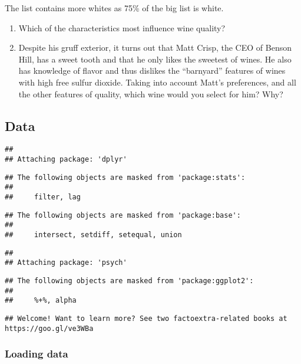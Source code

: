 \documentclass[
]{article}
\begin{document}
The list contains more whites as 75\% of the big list is white.

\begin{enumerate}
\def\labelenumi{\arabic{enumi}.}
\setcounter{enumi}{2}
\item
  Which of the characteristics most influence wine quality?
\item
  Despite his gruff exterior, it turns out that Matt Crisp, the CEO of
  Benson Hill, has a sweet tooth and that he only likes the sweetest of
  wines. He also has knowledge of flavor and thus dislikes the
  ``barnyard'' features of wines with high free sulfur dioxide. Taking
  into account Matt's preferences, and all the other features of
  quality, which wine would you select for him? Why?
\end{enumerate}

\hypertarget{data}{%
\subsection{Data}\label{data}}

\begin{verbatim}
## 
## Attaching package: 'dplyr'
\end{verbatim}

\begin{verbatim}
## The following objects are masked from 'package:stats':
## 
##     filter, lag
\end{verbatim}

\begin{verbatim}
## The following objects are masked from 'package:base':
## 
##     intersect, setdiff, setequal, union
\end{verbatim}

\begin{verbatim}
## 
## Attaching package: 'psych'
\end{verbatim}

\begin{verbatim}
## The following objects are masked from 'package:ggplot2':
## 
##     %+%, alpha
\end{verbatim}

\begin{verbatim}
## Welcome! Want to learn more? See two factoextra-related books at https://goo.gl/ve3WBa
\end{verbatim}

\hypertarget{loading-data}{%
\subsubsection{Loading data}\label{loading-data}}
\end{document}

